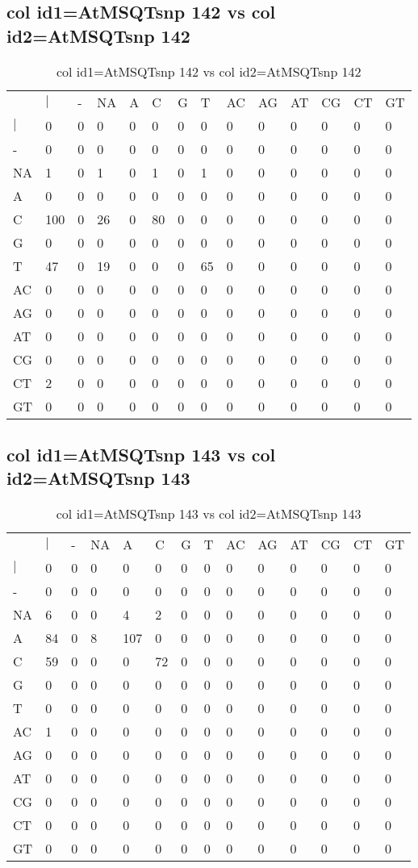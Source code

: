 \subsection{col id1=AtMSQTsnp 142 vs col id2=AtMSQTsnp 142}
\begin{center}
\begin{longtable}{|l|l|l|l|l|l|l|l|l|l|l|l|l|l|}
\caption{col id1=AtMSQTsnp 142 vs col id2=AtMSQTsnp 142} \label{table_dm724}\\
\hline
\\
\hline
&$|$&-&NA&A&C&G&T&AC&AG&AT&CG&CT&GT\\
$|$&0&0&0&0&0&0&0&0&0&0&0&0&0\\
-&0&0&0&0&0&0&0&0&0&0&0&0&0\\
NA&1&0&1&0&1&0&1&0&0&0&0&0&0\\
A&0&0&0&0&0&0&0&0&0&0&0&0&0\\
C&100&0&26&0&80&0&0&0&0&0&0&0&0\\
G&0&0&0&0&0&0&0&0&0&0&0&0&0\\
T&47&0&19&0&0&0&65&0&0&0&0&0&0\\
AC&0&0&0&0&0&0&0&0&0&0&0&0&0\\
AG&0&0&0&0&0&0&0&0&0&0&0&0&0\\
AT&0&0&0&0&0&0&0&0&0&0&0&0&0\\
CG&0&0&0&0&0&0&0&0&0&0&0&0&0\\
CT&2&0&0&0&0&0&0&0&0&0&0&0&0\\
GT&0&0&0&0&0&0&0&0&0&0&0&0&0\\
\hline
\end{longtable}
\end{center}

\subsection{col id1=AtMSQTsnp 143 vs col id2=AtMSQTsnp 143}
\begin{center}
\begin{longtable}{|l|l|l|l|l|l|l|l|l|l|l|l|l|l|}
\caption{col id1=AtMSQTsnp 143 vs col id2=AtMSQTsnp 143} \label{table_dm726}\\
\hline
\\
\hline
&$|$&-&NA&A&C&G&T&AC&AG&AT&CG&CT&GT\\
$|$&0&0&0&0&0&0&0&0&0&0&0&0&0\\
-&0&0&0&0&0&0&0&0&0&0&0&0&0\\
NA&6&0&0&4&2&0&0&0&0&0&0&0&0\\
A&84&0&8&107&0&0&0&0&0&0&0&0&0\\
C&59&0&0&0&72&0&0&0&0&0&0&0&0\\
G&0&0&0&0&0&0&0&0&0&0&0&0&0\\
T&0&0&0&0&0&0&0&0&0&0&0&0&0\\
AC&1&0&0&0&0&0&0&0&0&0&0&0&0\\
AG&0&0&0&0&0&0&0&0&0&0&0&0&0\\
AT&0&0&0&0&0&0&0&0&0&0&0&0&0\\
CG&0&0&0&0&0&0&0&0&0&0&0&0&0\\
CT&0&0&0&0&0&0&0&0&0&0&0&0&0\\
GT&0&0&0&0&0&0&0&0&0&0&0&0&0\\
\hline
\end{longtable}
\end{center}


